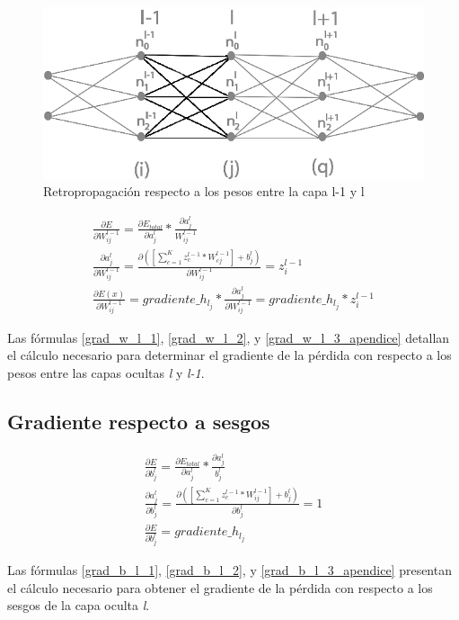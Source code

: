 \begin{figure}[H]
	\centering
	\includegraphics[scale=0.35]{imagenes/conclusion_pesos.jpg}  
	\caption{Retropropagación respecto a los pesos entre la capa l-1 y l}
	\label{fig:conclusion_pesos_apendice}
\end{figure}

\begin{gather}
	\frac{\partial E}{\partial W^{l-1}_{ij}} = \frac{\partial E_{total} }{\partial a^l_j } * \frac{\partial a^l_j}{W^{l-1}_{ij}} \label{grad_w_l_1} \\
	\frac{\partial a^l_j }{\partial W^{l-1}_{ij} } = \frac{\partial ([\sum_{c=1}^{K} z^{l-1}_c * W^{l-1}_{cj}] + b^l_j)}{\partial W^{l-1}_{ij} } = z^{l-1}_i \label{grad_w_l_2} \\
	\frac{\partial E(x) }{\partial W^{l-1}_{ij} } = gradiente\_h_{l_j} * \frac{\partial a^l_j }{\partial W^{l-1}_{ij} } = gradiente\_h_{l_j} * z^{l-1}_i \label{grad_w_l_3_apendice}
\end{gather}

Las fórmulas \ref{grad_w_l_1}, \ref{grad_w_l_2}, y \ref{grad_w_l_3_apendice} detallan el cálculo necesario para determinar el gradiente de la pérdida con respecto a los pesos entre las capas ocultas \textit{l} y \textit{l-1}.

\subsection{Gradiente respecto a sesgos}

\begin{gather}
	\frac{\partial E}{\partial b^l_j} = \frac{\partial E_{total} }{\partial a^l_j } * \frac{\partial a^l_j}{b^l_j} \label{grad_b_l_1} \\
	\frac{\partial a^l_j }{\partial b^l_j } = \frac{\partial ([\sum_{c=1}^{K} z^{l-1}_c * W^{l-1}_{ij}] + b^l_j) }{\partial b^l_j } = 1 \label{grad_b_l_2} \\
	\frac{\partial E}{\partial b^l_j} = gradiente\_h_{l_j} \label{grad_b_l_3_apendice}
\end{gather}

Las fórmulas \ref{grad_b_l_1}, \ref{grad_b_l_2}, y \ref{grad_b_l_3_apendice} presentan el cálculo necesario para obtener el gradiente de la pérdida con respecto a los sesgos de la capa oculta \textit{l}.
